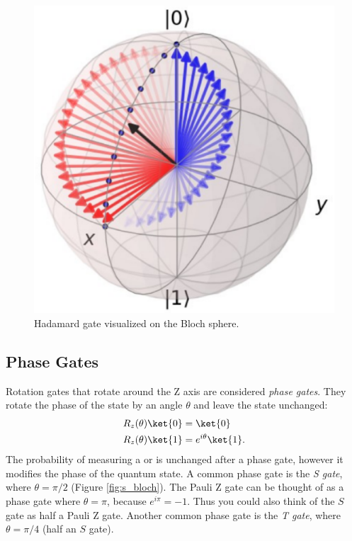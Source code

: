 \begin{figure}[ht]
  \centering
  \includegraphics[scale=0.165]{images/hadamard_gate.eps}
  \vspace{1mm}
  \caption{Hadamard gate visualized on the Bloch sphere.}
\end{figure}

\subsection{Phase Gates}
Rotation gates that rotate around the Z axis are considered \emph{phase gates}. They rotate the phase of the  state by an angle $\theta$ and leave the  state unchanged:
\begin{equation}
  \begin{aligned}
    R_z(\theta) \ket{0} &= \ket{0} \\
    R_z(\theta) \ket{1} &= e^{i\theta}\ket{1}.
  \end{aligned}
\end{equation}
The probability of measuring a  or  is unchanged after a phase gate, however it modifies the phase of the quantum state. A common phase gate is the \emph{S gate}, where $\theta = \pi/2$ (Figure \ref{fig:s_bloch}). The Pauli Z gate can be thought of as a phase gate where $\theta = \pi$, because $e^{i\pi} = -1$. Thus you could also think of the $S$ gate as half a Pauli Z gate. Another common phase gate is the \emph{T gate}, where $\theta = \pi/4$ (half an $S$ gate).

